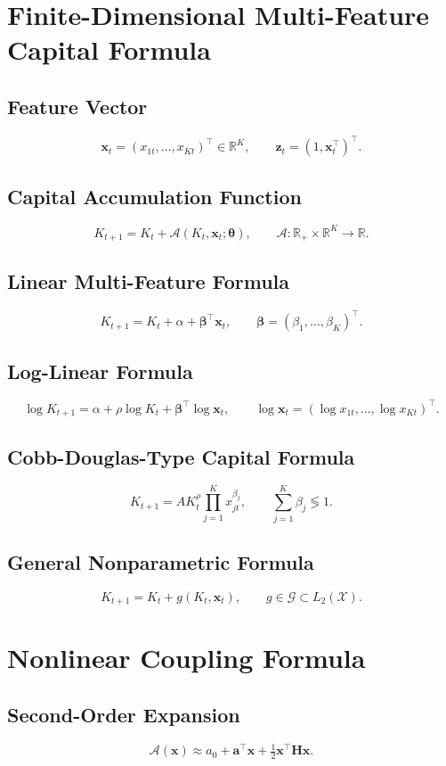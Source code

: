 \documentclass[11pt]{article}
\begin{document}
\section{Finite-Dimensional Multi-Feature Capital Formula}

\subsection{Feature Vector}
\[
\bm{x}_t=(x_{1t},\dots,x_{Kt})^\top\in\mathbb{R}^K,
\qquad \bm{z}_t=(1,\bm{x}_t^\top)^\top.
\]

\subsection{Capital Accumulation Function}
\[
K_{t+1}=K_t+\mathcal{A}(K_t,\bm{x}_t;\bm{\theta}),
\qquad \mathcal{A}:\mathbb{R}_+\times\mathbb{R}^K\to\mathbb{R}.
\]

\subsection{Linear Multi-Feature Formula}
\[
K_{t+1}=K_t+\alpha+\bm{\beta}^\top\bm{x}_t,
\qquad \bm{\beta}=(\beta_1,\ldots,\beta_K)^\top.
\]

\subsection{Log-Linear Formula}
\[
\log K_{t+1}=\alpha+\rho\log K_t+\bm{\beta}^\top\log\bm{x}_t,
\qquad \log\bm{x}_t=(\log x_{1t},\dots,\log x_{Kt})^\top.
\]

\subsection{Cobb-Douglas-Type Capital Formula}
\[
K_{t+1}=A K_t^{\rho}\prod_{j=1}^K x_{jt}^{\beta_j},
\qquad \sum_{j=1}^K\beta_j\lessgtr 1.
\]

\subsection{General Nonparametric Formula}
\[
K_{t+1}=K_t+g(K_t,\bm{x}_t),
\qquad g\in\mathcal{G}\subset L_2(\mathcal{X}).
\]

\section{Nonlinear Coupling Formula}

\subsection{Second-Order Expansion}
\[
\mathcal{A}(\bm{x})\approx a_0+\bm{a}^\top\bm{x}+\tfrac12\bm{x}^\top\bm{H}\bm{x}.
\]
\end{document}
